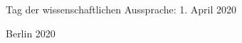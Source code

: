 \begin{titlepage}
\begin{center}
\begin{varwidth}{\textwidth}
    \vfill

      Tag der wissenschaftlichen Aussprache: 1. April 2020
    \end{varwidth}
  \end{center}
  \vspace{0.65cm}
  \begin{center}
    Berlin 2020

    \vfill

    {\textcolor{white}{\sffamily\docdate}}
  \end{center}
\end{titlepage}
